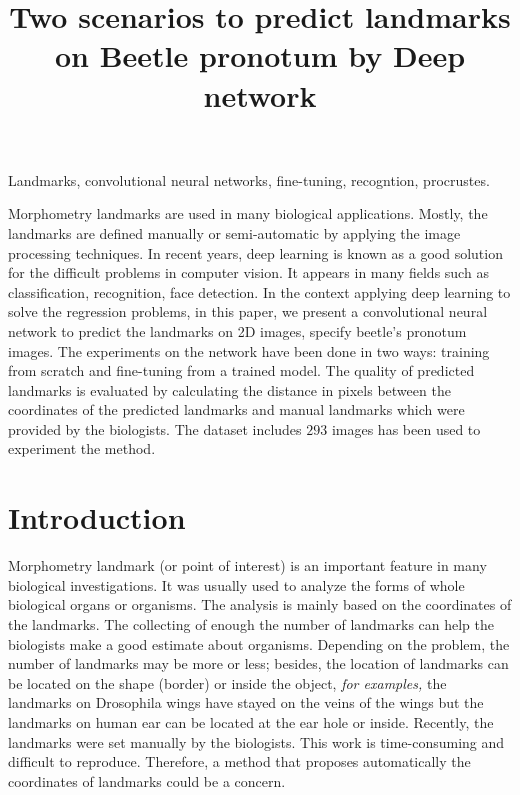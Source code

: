 \documentclass[10pt]{article}
\begin{document}
\noindent



\title{Two scenarios to predict landmarks on Beetle pronotum by Deep network}




\maketitle

\keywords
Landmarks, convolutional neural networks, fine-tuning, recogntion, procrustes.

\abstract
Morphometry landmarks are used in many biological applications. Mostly, the landmarks are defined manually or semi-automatic by applying the image processing techniques. In recent years, deep learning is known as a good solution for the difficult problems in computer vision. It appears in many fields such as classification, recognition, face detection. In the context applying deep learning to solve the regression problems, in this paper, we present a convolutional neural network to predict the landmarks on 2D images, specify beetle's pronotum images. The experiments on the network have been done in two ways: training from scratch and fine-tuning from a trained model. The quality of predicted landmarks is evaluated by calculating the distance in pixels between the coordinates of the predicted landmarks and manual landmarks which were provided by the biologists. The dataset includes $293$ images has been used to experiment the method.

\section{Introduction}
Morphometry landmark (or point of interest) is an important feature in many biological investigations. It was usually used to analyze the forms of whole biological organs or organisms. The analysis is mainly based on the coordinates of the landmarks. The collecting of enough the number of landmarks can help the biologists make a good estimate about organisms. Depending on the problem, the number of landmarks may be more or less; besides, the location of landmarks can be located on the shape (border) or inside the object, \textit{for examples,} the landmarks on Drosophila wings have stayed on the veins of the wings but the landmarks on human ear can be located at the ear hole or inside. Recently, the landmarks were set manually by the biologists. This work is time-consuming and difficult to reproduce. Therefore, a method that proposes automatically the coordinates of landmarks could be a concern. 
\end{document}
